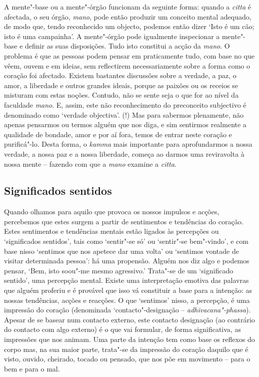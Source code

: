 A mente"-base ou a mente"-órgão funcionam da seguinte forma: quando a \emph{citta}
é afectada, o seu órgão, \emph{mano}, pode então produzir um conceito mental
adequado, de modo que, tendo reconhecido um objecto, podemos então dizer `Isto é
um cão; isto é uma campainha'. A mente"-órgão pode igualmente inspecionar a
mente"-base e definir as suas disposições. Tudo isto constitui a acção da
\emph{mano}. O problema é que as pessoas podem pensar em praticamente tudo, com
base no que vêem, ouvem e em ideias, sem reflectirem necessariamente sobre a
forma como o coração foi afectado. Existem bastantes discussões sobre a verdade,
a paz, o amor, a liberdade e outros grandes ideais, porque as paixões ou os
receios se misturam com estas noções. Contudo, não se sente seja o que for ao
nível da faculdade \emph{mano}. E, assim, este não reconhecimento do preconceito
subjectivo é denominado como `verdade objectiva'. (!) Mas para sabermos
plenamente, não apenas pensarmos ou termos alguém que nos diga, e sim sentirmos
realmente a qualidade de bondade, amor e por aí fora, temos de entrar neste
coração e purificá"-lo. Desta forma, o \emph{kamma} mais importante para
aprofundarmos a nossa verdade, a nossa paz e a nossa liberdade, começa ao darmos
uma reviravolta à nossa mente -- fazendo com que a \emph{mano} examine a
\emph{citta}.

\subsection{Significados sentidos}

Quando olhamos para aquilo que provoca os nossos impulsos e acções, percebemos
que estes surgem a partir de sentimentos e tendências do coração. Estes
sentimentos e tendências mentais estão ligados às percepções ou `significados
sentidos', tais como `sentir"-se só' ou `sentir"-se bem"-vindo', e com base nisso
`sentimos que nos apetece dar uma volta' ou `sentimos vontade de visitar
determinada pessoa': há uma propensão. Alguém nos diz algo e podemos pensar,
`Bem, isto soou"-me mesmo agressivo.' Trata"-se de um `significado sentido', uma
percepção mental. Existe uma interpretação emotiva das palavras que alguém
proferiu e é provável que isso vá constituir a base para a intenção: as nossas
tendências, acções e reacções. O que `sentimos' nisso, a percepção, é uma
impressão do coração (denominada `contacto"-designação --
\emph{adhivacana"-phassa}). Apesar de se basear num contacto externo, este
contacto designação (ao contrário do contacto com algo externo) é o que vai
formular, de forma significativa, as impressões que nos animam. Uma parte da
intenção tem como base os reflexos do corpo mas, na sua maior parte, trata"-se da
impressão do coração daquilo que é visto, ouvido, cheirado, tocado ou pensado,
que nos põe em movimento -- para o bem e para o mal.

